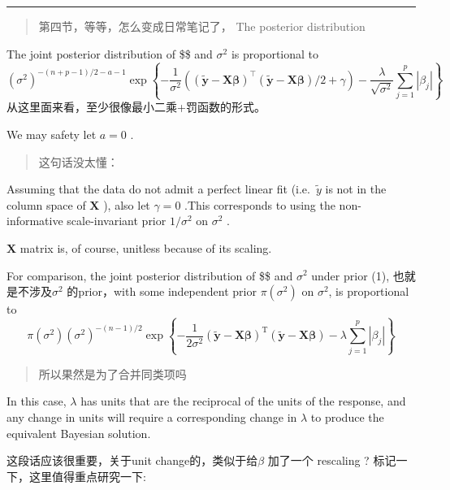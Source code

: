 \documentclass[
]{book}
\theoremstyle{definition}
\theoremstyle{definition}
\theoremstyle{definition}
\theoremstyle{remark}
\begin{document}
\begin{center}\rule{0.5\linewidth}{0.5pt}\end{center}

\begin{quote}
第四节，等等，怎么变成日常笔记了， The posterior distribution
\end{quote}

The joint posterior distribution of \$\boldsymbol \beta \$ and \(\sigma^2\) is proportional to
\[
\left(\sigma^{2}\right)^{-(n+p-1) / 2-a-1} \exp \left\{-\frac{1}{\sigma^{2}}\left((\tilde{\boldsymbol{y}}-\boldsymbol{X} \boldsymbol{\beta})^{\top}(\tilde{\boldsymbol{y}}-\boldsymbol{X} \boldsymbol{\beta}) / 2+\gamma\right)-\frac{\lambda}{\sqrt{\sigma^{2}}} \sum_{j=1}^{p}\left|\beta_{j}\right|\right\}
\]
从这里面来看，至少很像最小二乘+罚函数的形式。

We may safety let \(a=0\) .

\begin{quote}
这句话没太懂：
\end{quote}

Assuming that the data do not admit a perfect linear fit (i.e.~\(\tilde y\) is not in the column space of \(\boldsymbol X\) ), also let \(\gamma=0\) .This corresponds to using the non-informative scale-invariant prior \(1/\sigma^2\) on \(\sigma^2\) .

\(\boldsymbol X\) matrix is, of course, unitless because of its scaling.

For comparison, the joint posterior distribution of \$\boldsymbol \beta \$ and \(\sigma^2\) under prior (1), 也就是不涉及\(\sigma^2\) 的prior，with some independent prior \(\pi(\sigma^2)\) on \(\sigma^2\), is proportional to
\[
\pi\left(\sigma^{2}\right)\left(\sigma^{2}\right)^{-(n-1) / 2} \exp \left\{-\frac{1}{2 \sigma^{2}}(\tilde{\boldsymbol{y}}-\boldsymbol{X} \boldsymbol{\beta})^{\mathrm{T}}(\tilde{\boldsymbol{y}}-\boldsymbol{X} \boldsymbol{\beta})-\lambda \sum_{j=1}^{p}\left|\beta_{j}\right|\right\}
\]

\begin{quote}
所以果然是为了合并同类项吗
\end{quote}

In this case, \(\lambda\) has units that are the reciprocal of the units of the response, and any change in units will require a corresponding change in \(\lambda\) to produce the equivalent Bayesian solution.

这段话应该很重要，关于unit change的，类似于给\(\beta\) 加了一个 rescaling ? 标记一下，这里值得重点研究一下:
\end{document}
